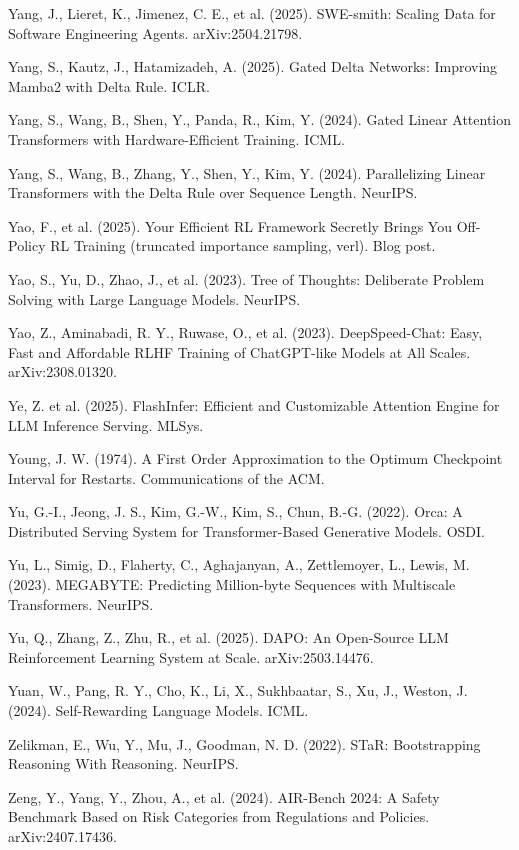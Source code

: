 {\begin{enumerate}[leftmargin=*,itemsep=1pt,label={[\arabic*]}]
\item Yang, J., Lieret, K., Jimenez, C. E., et al. (2025). SWE-smith: Scaling Data for Software Engineering Agents. arXiv:2504.21798.
\item Yang, S., Kautz, J., Hatamizadeh, A. (2025). Gated Delta Networks: Improving Mamba2 with Delta Rule. ICLR.
\item Yang, S., Wang, B., Shen, Y., Panda, R., Kim, Y. (2024). Gated Linear Attention Transformers with Hardware-Efficient Training. ICML.
\item Yang, S., Wang, B., Zhang, Y., Shen, Y., Kim, Y. (2024). Parallelizing Linear Transformers with the Delta Rule over Sequence Length. NeurIPS.
\item Yao, F., et al. (2025). Your Efficient RL Framework Secretly Brings You Off-Policy RL Training (truncated importance sampling, verl). Blog post.
\item Yao, S., Yu, D., Zhao, J., et al. (2023). Tree of Thoughts: Deliberate Problem Solving with Large Language Models. NeurIPS.
\item Yao, Z., Aminabadi, R. Y., Ruwase, O., et al. (2023). DeepSpeed-Chat: Easy, Fast and Affordable RLHF Training of ChatGPT-like Models at All Scales. arXiv:2308.01320.
\item Ye, Z. et al. (2025). FlashInfer: Efficient and Customizable Attention Engine for LLM Inference Serving. MLSys.
\item Young, J. W. (1974). A First Order Approximation to the Optimum Checkpoint Interval for Restarts. Communications of the ACM.
\item Yu, G.-I., Jeong, J. S., Kim, G.-W., Kim, S., Chun, B.-G. (2022). Orca: A Distributed Serving System for Transformer-Based Generative Models. OSDI.
\item Yu, L., Simig, D., Flaherty, C., Aghajanyan, A., Zettlemoyer, L., Lewis, M. (2023). MEGABYTE: Predicting Million-byte Sequences with Multiscale Transformers. NeurIPS.
\item Yu, Q., Zhang, Z., Zhu, R., et al. (2025). DAPO: An Open-Source LLM Reinforcement Learning System at Scale. arXiv:2503.14476.
\item Yuan, W., Pang, R. Y., Cho, K., Li, X., Sukhbaatar, S., Xu, J., Weston, J. (2024). Self-Rewarding Language Models. ICML.
\item Zelikman, E., Wu, Y., Mu, J., Goodman, N. D. (2022). STaR: Bootstrapping Reasoning With Reasoning. NeurIPS.
\item Zeng, Y., Yang, Y., Zhou, A., et al. (2024). AIR-Bench 2024: A Safety Benchmark Based on Risk Categories from Regulations and Policies. arXiv:2407.17436.

\end{enumerate}}
